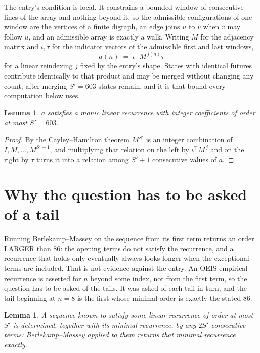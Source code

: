 \documentclass[11pt,a4paper]{article}
\theoremstyle{plain}
\newtheorem{lemma}[theorem]{Lemma}
\theoremstyle{definition}
\begin{document}
The entry's condition is local. It constrains a bounded window of consecutive lines of the
array and nothing beyond it, so the admissible configurations of one window are the vertices of
a finite digraph, an edge joins $u$ to $v$ when $v$ may follow $u$, and an admissible array is
exactly a walk. Writing $M$ for the adjacency matrix and $\iota,\tau$ for the indicator vectors
of the admissible first and last windows,
\[
a(n)\;=\;\iota^{\!\top}M^{\,j(n)}\tau
\]
for a linear reindexing $j$ fixed by the entry's shape. States with identical futures
contribute identically to that product and may be merged without changing any count; after
merging $S'=603$ states remain, and it is that bound every computation below uses.

\begin{lemma}\label{lem:cf}
$a$ satisfies a monic linear recurrence with integer coefficients of order at most $S'=603$.
\end{lemma}

\begin{proof}
By the Cayley--Hamilton theorem $M^{S'}$ is an integer combination of $I,M,\dots,M^{S'-1}$,
and multiplying that relation on the left by $\iota^{\!\top}M^{\,j}$ and on the right by
$\tau$ turns it into a relation among $S'+1$ consecutive values of $a$.
\end{proof}

\section{Why the question has to be asked of a tail}

Running Berlekamp--Massey on the sequence from its first term returns an order LARGER than $86$: the opening terms do not satisfy the recurrence, and a recurrence that holds only eventually always looks longer when the exceptional terms are included. That is not evidence against the entry. An OEIS empirical recurrence is asserted for $n$ beyond some index, not from the first term, so the question has to be asked of the tails. It was asked of each tail in turn, and the tail beginning at $n=8$ is the first whose minimal order is exactly the stated $86$.

\begin{lemma}\label{lem:bm}
A sequence known to satisfy some linear recurrence of order at most $S'$ is determined,
together with its minimal recurrence, by any $2S'$ consecutive terms: Berlekamp--Massey applied
to them returns that minimal recurrence exactly.
\end{lemma}
\end{document}
